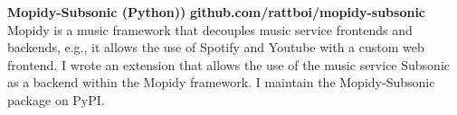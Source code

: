   \item 
  \headerrow 
  {\textbf{Mopidy-Subsonic (Python))}}
  {\textbf{github.com/rattboi/mopidy-subsonic}}
  \\
  Mopidy is a music framework that decouples music service frontends and backends, e.g., it allows the use of Spotify and Youtube with a custom web frontend. I wrote an extension that allows the use of the music service Subsonic as a backend within the Mopidy framework. I maintain the Mopidy-Subsonic package on PyPI.
